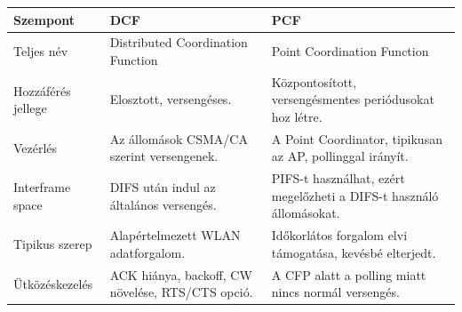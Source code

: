 
\begin{tabularx}{\textwidth}{L{37mm}L{45mm}X}
\toprule
\textbf{Szempont} & \textbf{DCF} & \textbf{PCF} \\
\midrule
Teljes név & Distributed Coordination Function & Point Coordination Function \\
Hozzáférés jellege & Elosztott, versengéses. & Központosított, versengésmentes periódusokat hoz létre. \\
Vezérlés & Az állomások CSMA/CA szerint versengenek. & A Point Coordinator, tipikusan az AP, pollinggal irányít. \\
Interframe space & DIFS után indul az általános versengés. & PIFS-t használhat, ezért megelőzheti a DIFS-t használó állomásokat. \\
Tipikus szerep & Alapértelmezett WLAN adatforgalom. & Időkorlátos forgalom elvi támogatása, kevésbé elterjedt. \\
Ütközéskezelés & ACK hiánya, backoff, CW növelése, RTS/CTS opció. & A CFP alatt a polling miatt nincs normál versengés. \\
\bottomrule
\end{tabularx}
